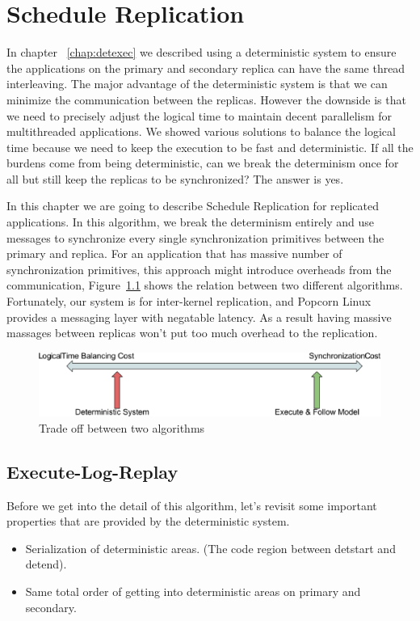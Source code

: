 \chapter{Schedule Replication}
In chapter ~\ref{chap:detexec} we described using a deterministic system to ensure the applications on the primary and secondary replica can have the same thread interleaving. The major advantage of the deterministic system is that we can minimize the communication between the replicas. However the downside is that we need to precisely adjust the logical time to maintain decent parallelism for multithreaded applications. We showed various solutions to balance the logical time because we need to keep the execution to be fast and deterministic. If all the burdens come from being deterministic, can we break the determinism once for all but still keep the replicas to be synchronized? The answer is yes.

In this chapter we are going to describe Schedule Replication for replicated applications. In this algorithm, we break the determinism entirely and use messages to synchronize every single synchronization primitives between the primary and replica. For an application that has massive number of synchronization primitives, this approach might introduce overheads from the communication, Figure~\ref{f:tradeoff} shows the relation between two different algorithms. Fortunately, our system is for inter-kernel replication, and Popcorn Linux provides a messaging layer with negatable latency. As a result having massive massages between replicas won't put too much overhead to the replication.

\begin{figure}
\centering
\includegraphics[width=0.8\columnwidth]{figures/tradeoff}
\caption{Trade off between two algorithms}
\label{f:tradeoff}
\end{figure}

\section{Execute-Log-Replay}
Before we get into the detail of this algorithm, let's revisit some important properties that are provided by the deterministic system.

\begin{itemize}
\item Serialization of deterministic areas. (The code region between detstart and detend).
\item Same total order of getting into deterministic areas on primary and secondary.
\end{itemize}

